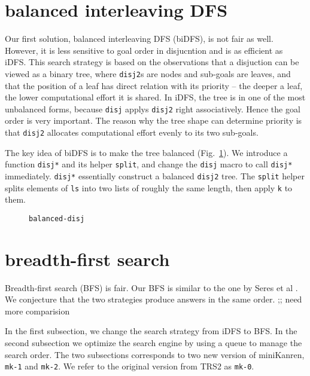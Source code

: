 \documentclass[format=acmlarge, review=true, authordraft=true]{acmart}
\begin{document}
\section{balanced interleaving DFS}

Our first solution, balanced interleaving DFS (biDFS), is not fair as well. 
However, it is less sensitive to goal order in disjucntion and is as efficient 
as iDFS. This search strategy is based on the  observations that a disjuction 
can be viewed as a binary tree, where \texttt{disj2}s are nodes 
and sub-goals are leaves, and that the position of a leaf has direct relation 
with its priority -- the deeper a leaf, the lower computational effort it is 
shared. In iDFS, the tree is in one of the most unbalanced forms, because 
\texttt{disj} applys \texttt{disj2} right associatively. Hence the goal order 
is very important. The reason why the tree shape can determine priority is that 
\texttt{disj2} allocates computational effort evenly to its two sub-goals.

The key idea of biDFS is to make the tree balanced (Fig.~\ref{balanced-disj}). 
We introduce a function \texttt{disj*} and its helper \texttt{split}, and change 
the \texttt{disj} macro to call \texttt{disj*} immediately. \texttt{disj*} 
essentially construct a balanced \texttt{disj2} tree. The \texttt{split} helper 
splits elements of \texttt{ls} into two lists of roughly the same length, then 
apply \texttt{k} to them.

\begin{figure}
  
  \caption{\texttt{balanced-disj}}
  \label{balanced-disj}
\end{figure}

\section{breadth-first search}


Breadth-first search (BFS) is fair. Our BFS is similar to the one by Seres et 
al \citet{seres1999algebra}. We conjecture that the two strategies produce
answers in the same order. ;; need more comparision

In the first subsection, we change the search strategy from iDFS to BFS. In the 
second subsection we optimize the search engine by using a queue to manage the 
search order. The two subsections corresponds to two new version of miniKanren, 
\texttt{mk-1} and \texttt{mk-2}. We refer to the original version from TRS2 as 
\texttt{mk-0}. 
\end{document}
